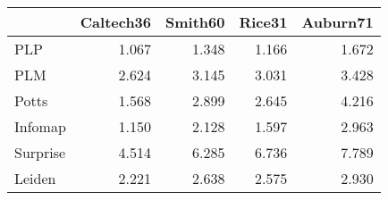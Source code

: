 \begin{tabular}{lrrrr}
\toprule
{} & Caltech36 & Smith60 & Rice31 & Auburn71 \\
\midrule
PLP      &     1.067 &   1.348 &  1.166 &    1.672 \\
PLM      &     2.624 &   3.145 &  3.031 &    3.428 \\
Potts    &     1.568 &   2.899 &  2.645 &    4.216 \\
Infomap  &     1.150 &   2.128 &  1.597 &    2.963 \\
Surprise &     4.514 &   6.285 &  6.736 &    7.789 \\
Leiden   &     2.221 &   2.638 &  2.575 &    2.930 \\
\bottomrule
\end{tabular}
